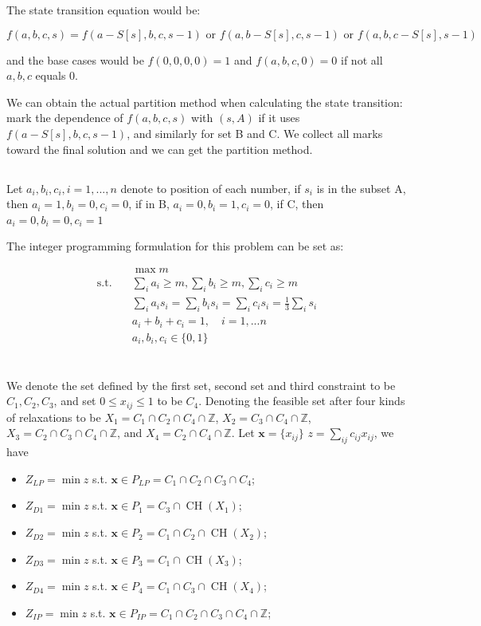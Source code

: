 \documentclass{article}
\newcommand{\x}{\bm x}
\begin{document}
The state transition equation would be:

$$
f(a,b,c,s) = f(a-S[s],b,c,s-1) \text{ or } f(a,b-S[s],c,s-1) \text{ or } f(a,b,c-S[s],s-1)
$$

and the base cases would be $f(0,0,0,0)=1$ and $f(a,b,c,0)=0$ if not all $a,b,c$ equals 0.

We can obtain the actual partition method when calculating the state transition: mark the dependence of $f(a,b,c,s)$ with $(s,A)$ if it uses $f(a-S[s],b,c,s-1)$, and similarly for set B and C. We collect all marks toward the final solution and we can get the partition method.


\subsection{}

Let $a_i, b_i, c_i, i= 1, ..., n $ denote to position of each number, if $s_i$ is in the subset A, then $a_i = 1, b_i = 0, c_i = 0$, if in B, $a_i = 0, b_i = 1, c_i = 0$, if C, then $a_i = 0, b_i = 0, c_i = 1$

The integer programming formulation for this problem can be set as:

\begin{align*}
    &\max m\quad \\
    \text{s.t.} \quad& \sum_ia_i\ge m, \sum_ib_i\ge m, \sum_ic_i\ge m  \\
    \quad & \sum_ia_i s_i = \sum_i b_i s_i = \sum_i c_i s_i = \frac{1}{3}\sum_is_i\\
    & a_i+ b_i+ c_i = 1, \quad i = 1, ... n \\
    & a_i, b_i, c_i \in \{0, 1\}
\end{align*}




\section{}
We denote the set defined by the first set, second set and third constraint to be $C_1,C_2,C_3$, and set $0\le x_{ij}\le 1$ to be $C_4$. Denoting the feasible set after four kinds of relaxations to be $X_1=C_1\cap C_2\cap C_4\cap\mathbb Z$, $X_2=C_3\cap C_4\cap\mathbb Z$, $X_3=C_2\cap C_3\cap C_4\cap\mathbb Z$, and $X_4=C_2\cap C_4\cap\mathbb Z$. Let $\x=\{x_{ij}\}$ $z=\sum_{ij}c_{ij}x_{ij}$, we have

\begin{itemize}
    \item $Z_{LP}=\min z$ s.t. $\x\in P_{LP}=C_1\cap C_2\cap C_3\cap C_4$;
    \item $Z_{D1}=\min z$ s.t. $\x\in P_1=C_3\cap \operatorname{CH}(X_1)$;
    \item $Z_{D2}=\min z$ s.t. $\x\in P_2=C_1\cap C_2\cap \operatorname{CH}(X_2)$;
    \item $Z_{D3}=\min z$ s.t. $\x\in P_3=C_1\cap \operatorname{CH}(X_3)$;
    \item $Z_{D4}=\min z$ s.t. $\x\in P_4=C_1\cap C_3\cap \operatorname{CH}(X_4)$;
    \item $Z_{IP}=\min z$ s.t. $\x\in P_{IP}=C_1\cap C_2\cap C_3\cap C_4\cap\mathbb Z$;
\end{itemize}
\end{document}
